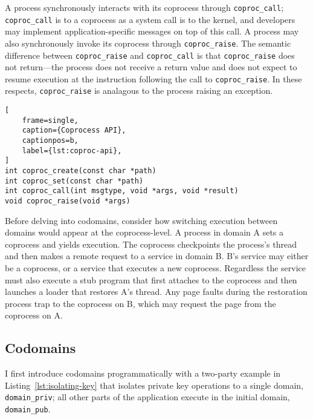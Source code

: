 A process synchronously interacts with its coprocess through
\texttt{coproc\_call}; \texttt{coproc\_call} is to a coprocess as a system call
is to the kernel, and developers may implement application-specific messages
on top of this call.
%
A process may also synchronously invoke its coprocess through
\texttt{coproc\_raise}.
%
The semantic difference between \texttt{coproc\_raise} and
\texttt{coproc\_call} is that \texttt{coproc\_raise} does not return---the
process does not receive a return value and does not expect to resume
execution at the instruction following the call to \texttt{coproc\_raise}.
%
In these respects, \texttt{coproc\_raise} is analagous to the process raising
an exception.

\begin{lstlisting}[
    frame=single, 
    caption={Coprocess API},
    captionpos=b,
    label={lst:coproc-api},
]
int coproc_create(const char *path)
int coproc_set(const char *path)
int coproc_call(int msgtype, void *args, void *result)
void coproc_raise(void *args)
\end{lstlisting}


%


%
Before delving into codomains, consider how switching execution between domains
would appear at the coprocess-level.
%
A process in domain A sets a coprocess and yields execution.
%
The coprocess checkpoints the process's thread and then makes a remote request
to a service in domain B\@.
%
B's service may either be a coprocess, or a service that executes a new
coprocess.
%
Regardless the service must also execute a stub program that first attaches to the
coprocess and then launches a loader that restores A's thread.
%
Any page faults during the restoration process trap to the coprocess on B,
which may request the page from the coprocess on A.


\subsection{Codomains}

I first introduce codomains programmatically with a two-party example in
Listing~\ref{lst:isolating-key} that isolates private key operations to a
single domain, \texttt{domain\_priv}; all other parts of the application
execute in the initial domain, \texttt{domain\_pub}.

